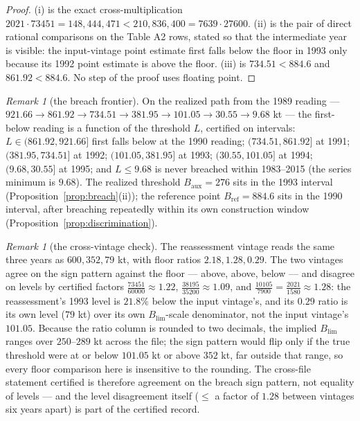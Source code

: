 \documentclass[10pt,twocolumn]{article}
\theoremstyle{plain}
\theoremstyle{remark}
\newtheorem{remark}[theorem]{Remark}
\begin{document}
\begin{proof}
(i) is the exact cross-multiplication
\(2021 \cdot 73451 = 148{,}444{,}471 < 210{,}836{,}400 = 7639 \cdot
27600\). (ii) is the pair of direct rational comparisons
on the Table A2 rows, stated so that the intermediate year is visible:
the input-vintage point estimate first falls below the floor in 1993 only because its 1992 point estimate is above the floor. (iii) is \(734.51 < 884.6\) and \(861.92 < 884.6\).
No step of the proof uses floating point.
\end{proof}

\begin{remark}[the breach frontier]\label{rem:frontier}
On the realized path from the 1989 reading --- \(921.66 \to 861.92 \to
734.51 \to 381.95 \to 101.05 \to 30.55 \to 9.68\) kt --- the
first-below reading is a function of the threshold \(L\), certified on
intervals: \(L \in (861.92, 921.66]\) first falls below at the 1990
reading; \((734.51, 861.92]\) at 1991; \((381.95, 734.51]\) at 1992;
\((101.05, 381.95]\) at 1993; \((30.55, 101.05]\) at 1994;
\((9.68, 30.55]\) at 1995; and \(L \le 9.68\) is never breached within
1983--2015 (the series minimum is \(9.68\)). The realized threshold
\(B_{\mathrm{aux}} = 276\) sits in the 1993 interval
(Proposition~\ref{prop:breach}(ii)); the reference point
\(B_{\mathrm{ref}} = 884.6\) sits in the 1990 interval, after breaching
repeatedly within its own construction window
(Proposition~\ref{prop:discrimination}).
\end{remark}

\begin{remark}[the cross-vintage check]\label{rem:xtevintage}
The reassessment vintage reads the same three years as
\(600, 352, 79\) kt, with floor ratios \(2.18, 1.28, 0.29\). The two
vintages agree on the sign pattern against the floor --- above, above,
below --- and disagree on levels by certified factors
\(\tfrac{73451}{60000} \approx 1.22\),
\(\tfrac{38195}{35200} \approx 1.09\), and
\(\tfrac{10105}{7900} = \tfrac{2021}{1580} \approx 1.28\): the
reassessment's 1993 level is \(21.8\%\) below the input vintage's, and
its \(0.29\) ratio is its own level (\(79\) kt) over its own
\(B_{\mathrm{lim}}\)-scale denominator, not the input vintage's
\(101.05\). Because the ratio column is rounded to two decimals, the
implied \(B_{\mathrm{lim}}\) ranges over \(250\)--\(289\) kt across
the file; the sign pattern would flip only if the true threshold were
at or below \(101.05\) kt or above \(352\) kt, far outside that range,
so every floor comparison here is insensitive to the rounding. The
cross-file statement certified is therefore agreement on the breach
sign pattern, not equality of levels --- and the level disagreement
itself (\(\le\) a factor of \(1.28\) between vintages six years
apart) is part of the certified record.
\end{remark}
\end{document}
